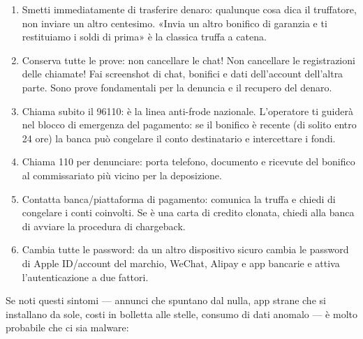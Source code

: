 \begin{enumerate}
  \item Smetti immediatamente di trasferire denaro: qualunque cosa dica il truffatore, non inviare un altro centesimo. «Invia un altro bonifico di garanzia e ti restituiamo i soldi di prima» è la classica truffa a catena.
  \item Conserva tutte le prove: non cancellare le chat! Non cancellare le registrazioni delle chiamate! Fai screenshot di chat, bonifici e dati dell'account dell'altra parte. Sono prove fondamentali per la denuncia e il recupero del denaro.
  \item Chiama subito il 96110: è la linea anti-frode nazionale. L'operatore ti guiderà nel blocco di emergenza del pagamento: se il bonifico è recente (di solito entro 24 ore) la banca può congelare il conto destinatario e intercettare i fondi.
  \item Chiama 110 per denunciare: porta telefono, documento e ricevute del bonifico al commissariato più vicino per la deposizione.
  \item Contatta banca/piattaforma di pagamento: comunica la truffa e chiedi di congelare i conti coinvolti. Se è una carta di credito clonata, chiedi alla banca di avviare la procedura di chargeback.
  \item Cambia tutte le password: da un altro dispositivo sicuro cambia le password di Apple ID/account del marchio, WeChat, Alipay e app bancarie e attiva l'autenticazione a due fattori.
\end{enumerate}


Se noti questi sintomi — annunci che spuntano dal nulla, app strane che si installano da sole, costi in bolletta alle stelle, consumo di dati anomalo — è molto probabile che ci sia malware:

